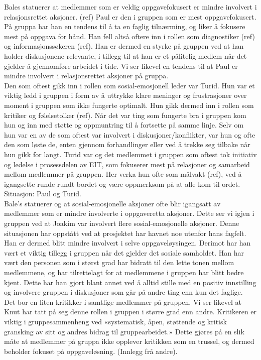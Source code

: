 Bales statuerer at medlemmer som er veldig oppgavefokusert er mindre involvert i relasjonsrettet aksjoner. (ref) Paul er den i gruppen som er mest oppgavefokusert. På gruppa har han en tendens til å ta en faglig tilnærming, og liker å fokusere mest på oppgava for hånd. Han fell altså oftere inn i rollen som diagnostiker (ref) og informasjonssøkeren (ref). Han er dermed en styrke på gruppen ved at han holder diskusjonene relevante, i tillegg til at han er et pålitelig medlem når det gjelder å gjennomføre arbeidet i tide. Vi ser likevel en tendens til at Paul er mindre involvert i relasjonsrettet aksjoner på gruppa. \\
Den som oftest gikk inn i rollen som sosial-emosjonell leder var Turid. Hun var et viktig ledd i gruppen i form av å uttrykke klare meninger og frustrasjoner over moment i gruppen som ikke fungerte optimalt. Hun gikk dermed inn i rollen som kritiker og følelsetolker (ref). Når det var ting som fungerte bra i gruppen kom hun og inn med støtte og oppmuntring til å fortsette på samme linje. Selv om hun var en av de som oftest var involvert i diskusjoner/konflikter, var hun og ofte den som løste de, enten gjennom forhandlinger eller ved å trekke seg tilbake når hun gikk for langt. Turid var og det medlemmet i gruppen som oftest tok initiativ og ledelse i prosessdelen av EIT, som fokuserer mest på relasjoner og samarbeid mellom medlemmer på gruppen. Her verka hun ofte som målvakt (ref), ved å igangsette runde rundt bordet og være oppmerksom på at alle kom til ordet.
Situasjon: Paul og Turid.\\

Bale's statuerer og at sosial-emosjonelle aksjoner ofte blir igangsatt av medlemmer som er mindre involverte i oppgaveretta aksjoner. Dette ser vi igjen i gruppen ved at Joakim var involvert flere sosial-emosjonelle aksjoner. Denne situasjonen har oppstått ved at prosjektet har havnet noe utenfor hans fagfelt. Han er dermed blitt mindre involvert i selve oppgaveløysingen. Derimot har han vært et viktig tillegg i gruppen når det gjelder det sosiale samholdet. Han har vært den personen som i størst grad har bidratt til den lette tonen mellom medlemmene, og har tilrettelagt for at medlemmene i gruppen har blitt bedre kjent. Dette har han gjort blant annet ved å alltid stille med en positiv innstilling og involvere gruppen i diskusjoner som går på andre ting enn kun det faglige.\\

Det bor en liten kritikker i samtlige medlemmer på gruppen. Vi ser likevel at Knut har tatt på seg denne rollen i gruppen i større grad enn andre. Kritikeren er viktig i gruppesammenheng ved «systematisk, åpen, støttende og kritisk gransking av sitt og andres bidrag til gruppearbeidet.»
Dette gjøres på en slik måte at medlemmer på gruppa ikke opplever kritikken som en trussel, og dermed beholder fokuset på oppgaveløsning. (Innlegg frå andre).\\

